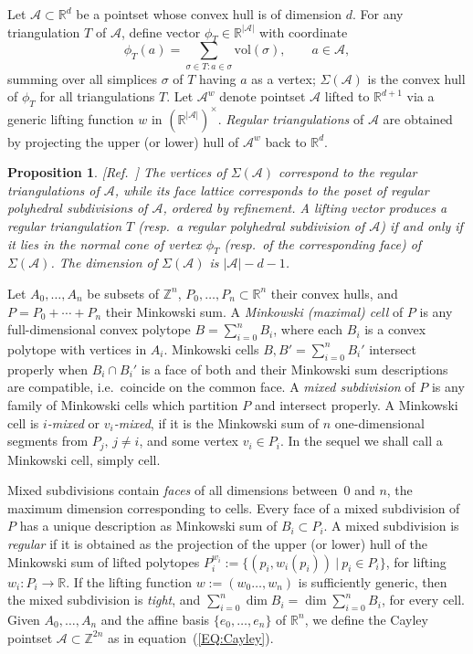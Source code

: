 \documentclass{article}
\newtheorem{proposition}{Proposition}
\newcommand\refcite[1]{\citealp{#1}} \newcommand\citess[1]{\textsuperscript{\textup{\citealp{#1}}}}
\def\RR{{\mathbb R}} \def\ZZ{{\mathbb Z}}
\def\A{{\mathcal A}} \def\R{{\mathcal R}}
\begin{document}
Let $\A\subset\RR^d$ be a pointset whose convex hull is of dimension $d$. 
For any triangulation $T$ of $\A$, define vector $\phi_T\in\RR^{|\A|}$
with coordinate
\begin{equation}\label{Evolume_embed}
\phi_T(a)= \sum_{\sigma\in T : a\in \sigma} \mbox{vol}(\sigma), \qquad a\in\A,
\end{equation}
summing over all simplices $\sigma$ of $T$ having $a$ as a vertex; $\Sigma(\A)$
is the convex hull of $\phi_T$ for all triangulations $T$.
Let  $\A^w$ denote pointset $\A$ lifted to $\RR^{d+1}$
via a generic lifting function $w$ in $(\RR^{|\A|})^{\times}$.
{\em Regular triangulations} of $\A$ are obtained
by projecting the upper (or lower) hull of $\A^w$ 
back to $\RR^d$.
\begin{proposition}{\rm [Ref.~\refcite{GKZ}]}
The vertices of $\Sigma(\A)$ correspond to the regular triangulations of $\A$,
while its face lattice corresponds to the poset 
of regular polyhedral subdivisions of $\A$, ordered by refinement. 
A lifting vector produces a regular triangulation $T$
(resp.\ a regular polyhedral subdivision of $\A$)
if and only if it lies in the normal cone of vertex $\phi_T$
(resp.\ of the corresponding face) of $\Sigma(\A)$.  
The dimension of $\Sigma(\A)$ is $|\A|-d-1$. 
\end{proposition}
Let $A_0,\ldots,A_n$ be subsets of $\ZZ^n$,
$P_0,\ldots,P_n\subset \RR^n$ their convex hulls, and 
$P=P_0+\cdots+P_n$ their Minkowski sum.
A \emph{Minkowski (maximal) cell} of $P$ is any full-dimensional convex
polytope $B=\sum_{i=0}^{n} B_i$, where each $B_i$ is a convex polytope
with vertices in $A_i$.
Minkowski cells $B, B'=\sum_{i=0}^{n} B_i'$
intersect properly when $B_i\cap B_i'$ is a face of both and their
Minkowski sum descriptions are compatible, i.e.\ coincide on the common face.
A \textit{mixed subdivision} of $P$ is any family of
Minkowski cells which partition $P$ and intersect properly.
A Minkowski cell is \textit{$i$-mixed} or \textit{$v_{i}$-mixed},
if it is the Minkowski sum of $n$ one-dimensional segments from
$P_j,\, j\ne i$, and some vertex $v_{i} \in P_i$. In the sequel we shall call
a Minkowski cell, simply cell.

Mixed subdivisions contain {\em faces} of all dimensions between~0 and $n$,
the maximum dimension corresponding to cells.
Every face of a mixed subdivision of $P$ has a unique description as
Minkowski sum of $B_i\subset P_i$.
A mixed subdivision is {\em regular} if it is obtained as the projection
of the upper (or lower) hull of the Minkowski sum of lifted polytopes
$P_i^{w_i}:=\{(p_i,w_i(p_i))~|~ p_i \in P_i\}$, for lifting
$w_i:P_i\rightarrow\RR$.
If the lifting function $w:=(w_0\ldots,w_n)$ is sufficiently generic,
then the mixed subdivision is \emph{tight}, and
$\sum_{i=0}^n \dim B_i=\dim \sum_{i=0}^n B_i$, for every cell.
Given $A_0,\ldots,A_n$ and the affine basis $\{e_0,\ldots,e_n\}$ of $\RR^n$,
we define the Cayley pointset $\A\subset\ZZ^{2n}$ as in
equation~(\ref{EQ:Cayley}).
\end{document}
